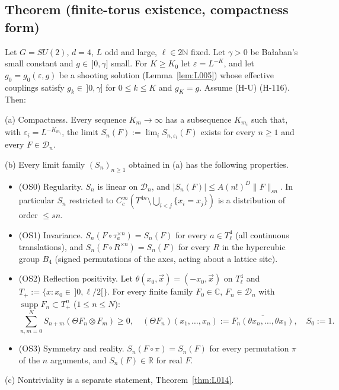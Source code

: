 \subsection{Theorem (finite-torus existence, compactness form)}\label{sec:existthm}
\begin{theorem}\label{thm:L013}
Let $G=SU(2)$, $d=4$, $L$ odd and large, $\ell\in2\mathbb N$ fixed. Let $\gamma>0$ be Ba{\l}aban's small constant and $g\in\,]0,\gamma]$ small. For $K\ge K_0$ let $\varepsilon=L^{-K}$, and let $g_0=g_0(\varepsilon,g)$ be a shooting solution (Lemma~\ref{lem:L005}) whose effective couplings satisfy $g_k\in\,]0,\gamma]$ for $0\le k\le K$ and $g_K=g$. Assume (H-U) (H-116). Then:

(a) Compactness. Every sequence $K_m\to\infty$ has a subsequence $K_{m_i}$ such that, with $\varepsilon_i=L^{-K_{m_i}}$, the limit $S_n(F):=\lim_iS_{n,\varepsilon_i}(F)$ exists for every $n\ge1$ and every $F\in\mathcal D_n$.

(b) Every limit family $(S_n)_{n\ge1}$ obtained in (a) has the following properties.
\begin{itemize}
\item (OS0) Regularity. $S_n$ is linear on $\mathcal D_n$, and $|S_n(F)|\le A(n!)^D\|F\|_{sn}$. In particular $S_n$ restricted to $C_c^\infty(T^{4n}\setminus\bigcup_{i<j}\{x_i=x_j\})$ is a distribution of order $\le sn$.
\item (OS1) Invariance. $S_n(F\circ\tau_a^{\times n})=S_n(F)$ for every $a\in T^4_\ell$ (all continuous translations), and $S_n(F\circ R^{\times n})=S_n(F)$ for every $R$ in the hypercubic group $B_4$ (signed permutations of the axes, acting about a lattice site).
\item (OS2) Reflection positivity. Let $\theta(x_0,\vec x)=(-x_0,\vec x)$ on $T^4_\ell$ and $T_+:=\{x:x_0\in\,]0,\ell/2[\}$. For every finite family $F_0\in\mathbb C$, $F_n\in\mathcal D_n$ with $\operatorname{supp}F_n\subset T_+^n$ ($1\le n\le N$):
\[\sum_{n,m=0}^NS_{n+m}(\Theta F_n\otimes F_m)\ge0,\quad(\Theta F_n)(x_1,\dots,x_n):=\overline{F_n(\theta x_n,\dots,\theta x_1)},\quad S_0:=1.\]
\item (OS3) Symmetry and reality. $S_n(F\circ\pi)=S_n(F)$ for every permutation $\pi$ of the $n$ arguments, and $S_n(F)\in\mathbb R$ for real $F$.
\end{itemize}

(c) Nontriviality is a separate statement, Theorem~\ref{thm:L014}.
\end{theorem}

